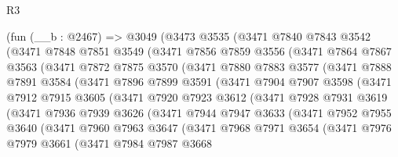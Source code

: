 \begin{lexlean}{R3}
\begin{coremodule}
    (fun (__b : @2467) =>
    @3049
      (@3473
        @3535
        (@3471
          @7840
          @7843
          @3542
          (@3471
            @7848
            @7851
            @3549
            (@3471
              @7856
              @7859
              @3556
              (@3471
                @7864
                @7867
                @3563
                (@3471
                  @7872
                  @7875
                  @3570
                  (@3471
                    @7880
                    @7883
                    @3577
                    (@3471
                      @7888
                      @7891
                      @3584
                      (@3471
                        @7896
                        @7899
                        @3591
                        (@3471
                          @7904
                          @7907
                          @3598
                          (@3471
                            @7912
                            @7915
                            @3605
                            (@3471
                              @7920
                              @7923
                              @3612
                              (@3471
                                @7928
                                @7931
                                @3619
                                (@3471
                                  @7936
                                  @7939
                                  @3626
                                  (@3471
                                    @7944
                                    @7947
                                    @3633
                                    (@3471
                                      @7952
                                      @7955
                                      @3640
                                      (@3471
                                        @7960
                                        @7963
                                        @3647
                                        (@3471
                                          @7968
                                          @7971
                                          @3654
                                          (@3471
                                            @7976
                                            @7979
                                            @3661
                                            (@3471
                                              @7984
                                              @7987
                                              @3668

\end{coremodule}
\end{lexlean}
